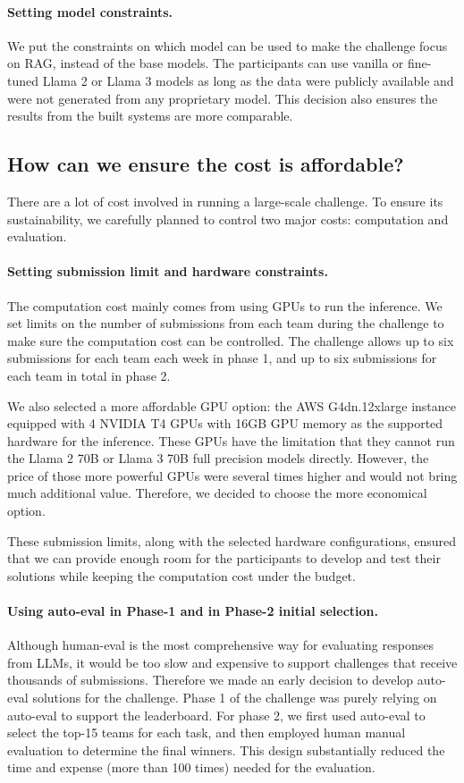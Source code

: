 \paragraph{Setting model constraints.}
We put the constraints on which model can be used to make the challenge focus on RAG, instead of the base models. The participants can use vanilla or fine-tuned Llama 2 or Llama 3 models as long as the data were publicly available and were not generated from any proprietary model. This decision also ensures the results from the built systems are more comparable. 



\subsection{How can we ensure the cost is affordable?}
There are a lot of cost involved in running a large-scale challenge. To ensure its sustainability, we carefully planned to control two major costs: computation and evaluation.

\paragraph{Setting submission limit and hardware constraints.} 
The computation cost mainly comes from using GPUs to run the inference. We set limits on the number of submissions from each team during the challenge to make sure the computation cost can be controlled. The challenge allows up to six submissions for each team each week in phase 1, and up to six submissions for each team in total in phase 2. 

We also selected a more affordable GPU option: the AWS G4dn.12xlarge instance equipped with 4 NVIDIA T4 GPUs with 16GB GPU memory as the supported hardware for the inference. These GPUs have the limitation that they cannot run the Llama 2 70B or Llama 3 70B full precision models directly. However, the price of those more powerful GPUs were several times higher and would not bring much additional value. Therefore, we decided to choose the more economical option.  

These submission limits, along with the selected hardware configurations, ensured that we can provide enough room for the participants to develop and test their solutions while keeping the computation cost under the budget. 

\paragraph{Using auto-eval in Phase-1 and in Phase-2 initial selection.} 
Although human-eval is the most comprehensive way for evaluating responses from LLMs, it would be too slow and expensive to support challenges that receive thousands of submissions. Therefore we made an early decision to develop auto-eval solutions for the challenge. Phase 1 of the challenge was purely relying on auto-eval to support the leaderboard. For phase 2, we first used auto-eval to select the top-15 teams for each task, and then employed human manual evaluation to determine the final winners. This design substantially reduced the time and expense (more than 100 times) needed for the evaluation. 

